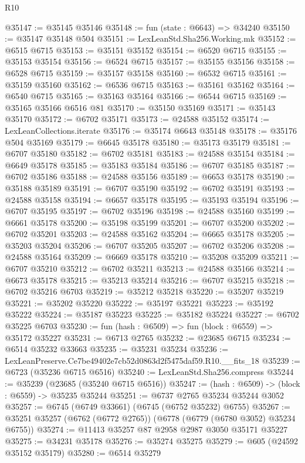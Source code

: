 \begin{lexlean}{R10}
\begin{coremodule}
@35147 := @35145 @35146
@35148 := fun (state : @6643) => @34240
@35150 := @35147 @35148 @504
@35151 := LexLeanStd.Sha256.Working.mk
@35152 := @6515 @6715
@35153 := @35151 @35152
@35154 := @6520 @6715
@35155 := @35153 @35154
@35156 := @6524 @6715
@35157 := @35155 @35156
@35158 := @6528 @6715
@35159 := @35157 @35158
@35160 := @6532 @6715
@35161 := @35159 @35160
@35162 := @6536 @6715
@35163 := @35161 @35162
@35164 := @6540 @6715
@35165 := @35163 @35164
@35166 := @6544 @6715
@35169 := @35165 @35166 @6516 @81
@35170 := @35150 @35169
@35171 := @35143 @35170
@35172 := @6702 @35171
@35173 := @24588 @35152
@35174 := LexLeanCollections.iterate
@35176 := @35174 @6643 @35148
@35178 := @35176 @504 @35169
@35179 := @6645 @35178
@35180 := @35173 @35179
@35181 := @6707 @35180
@35182 := @6702 @35181
@35183 := @24588 @35154
@35184 := @6649 @35178
@35185 := @35183 @35184
@35186 := @6707 @35185
@35187 := @6702 @35186
@35188 := @24588 @35156
@35189 := @6653 @35178
@35190 := @35188 @35189
@35191 := @6707 @35190
@35192 := @6702 @35191
@35193 := @24588 @35158
@35194 := @6657 @35178
@35195 := @35193 @35194
@35196 := @6707 @35195
@35197 := @6702 @35196
@35198 := @24588 @35160
@35199 := @6661 @35178
@35200 := @35198 @35199
@35201 := @6707 @35200
@35202 := @6702 @35201
@35203 := @24588 @35162
@35204 := @6665 @35178
@35205 := @35203 @35204
@35206 := @6707 @35205
@35207 := @6702 @35206
@35208 := @24588 @35164
@35209 := @6669 @35178
@35210 := @35208 @35209
@35211 := @6707 @35210
@35212 := @6702 @35211
@35213 := @24588 @35166
@35214 := @6673 @35178
@35215 := @35213 @35214
@35216 := @6707 @35215
@35218 := @6702 @35216 @6703
@35219 := @35212 @35218
@35220 := @35207 @35219
@35221 := @35202 @35220
@35222 := @35197 @35221
@35223 := @35192 @35222
@35224 := @35187 @35223
@35225 := @35182 @35224
@35227 := @6702 @35225 @6703
@35230 := fun (hash : @6509) => fun (block : @6559) => @35172 @35227
@35231 := @6713 @2765
@35232 := @23685 @6715
@35234 := @6514 @35232 @33663
@35235 := @35231 @35234
@35236 := LexLeanPreserve.Ce7be49402e7cb52d0863d2f5475daf59.R10.__fits_18
@35239 := @6723 (@35236 @6715 @6516)
@35240 := LexLeanStd.Sha256.compress
@35244 := @35239 (@23685 (@35240 @6715 @6516))
@35247 := (hash : @6509) -> (block : @6559) -> @35235 @35244
@35251 := @6737 @2765 @35234 @35244 @3052
@35257 := @6745 (@6749 @33661) (@6745 (@6752 @35232) @6755)
@35267 := @35251 @35257 (@6762 (@6772 @2765)) (@6778 (@6779 (@6780 @3052) @35234 @6755))
@35274 := @11413 @35257 @87 @2958 @2987 @3050 @35171 @35227
@35275 := @34231 @35178
@35276 := @35274 @35275
@35279 := @605 (@24592 @35152 @35179)
@35280 := @6514 @35279

\end{coremodule}
\end{lexlean}
